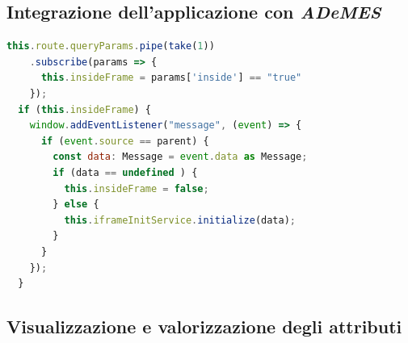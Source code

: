 \subsection*{Integrazione dell'applicazione con \textit{ADeMES}}
\label{subsec:integrazione}
\begin{lstlisting}[language=JavaScript, caption="Integrazione dell'applicazione con \textit{ADeMES}]
this.route.queryParams.pipe(take(1))
    .subscribe(params => {
      this.insideFrame = params['inside'] == "true"
    });
  if (this.insideFrame) {
    window.addEventListener("message", (event) => {
      if (event.source == parent) {
        const data: Message = event.data as Message;
        if (data == undefined ) {
          this.insideFrame = false;
        } else {
          this.iframeInitService.initialize(data);
        }
      }
    });
  }
\end{lstlisting}


\newpage
\subsection*{Visualizzazione e valorizzazione degli attributi}

